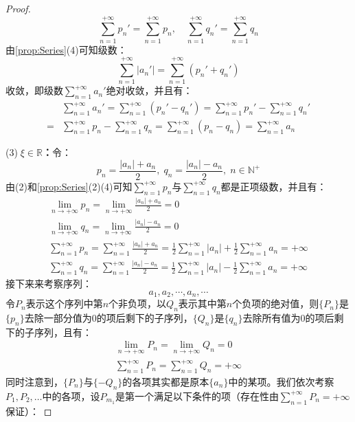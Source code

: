 \begin{proof}
	\begin{equation*}
		\sum_{n=1}^{+\infty}p_n'=\sum_{n=1}^{+\infty}p_n,\quad
		\sum_{n=1}^{+\infty}q_n'=\sum_{n=1}^{+\infty}q_n
	\end{equation*}
	由\cref{prop:Series}(4)可知级数：
	\begin{equation*}
		\sum_{n=1}^{+\infty}|a_n'|=\sum_{n=1}^{+\infty}(p_n'+q_n')
	\end{equation*}
	收敛，即级数$\sum\limits_{n=1}^{+\infty}a_n'$绝对收敛，并且有：
	\begin{align*}
		&\sum_{n=1}^{+\infty}a_n'=\sum_{n=1}^{+\infty}(p_n'-q_n')=\sum_{n=1}^{+\infty}p_n'-\sum_{n=1}^{+\infty}q_n' \\
		=&\sum_{n=1}^{+\infty}p_n-\sum_{n=1}^{+\infty}q_n=\sum_{n=1}^{+\infty}(p_n-q_n)=\sum_{n=1}^{+\infty}a_n
	\end{align*}\par
	(3)\textbf{$\;\xi\in\mathbb{R}$：}令：
	\begin{equation*}
		p_n=\frac{|a_n|+a_n}{2},\;q_n=\frac{|a_n|-a_n}{2},\;n\in\mathbb{N}^+
	\end{equation*}
	由(2)和\cref{prop:Series}(2)(4)可知$\sum\limits_{n=1}^{+\infty}p_n$与$\sum\limits_{n=1}^{+\infty}q_n$都是正项级数，并且有：
	\begin{gather*}
		\lim_{n\to+\infty}p_n=\lim_{n\to+\infty}\frac{|a_n|+a_n}{2}=0 \\
		\lim_{n\to+\infty}q_n=\lim_{n\to+\infty}\frac{|a_n|-a_n}{2}=0 \\
		\sum_{n=1}^{+\infty}p_n=\sum_{n=1}^{+\infty}\frac{|a_n|+a_n}{2}=\frac{1}{2}\sum_{n=1}^{+\infty}|a_n|+\frac{1}{2}\sum_{n=1}^{+\infty}a_n=+\infty \\
		\sum_{n=1}^{+\infty}q_n=\sum_{n=1}^{+\infty}\frac{|a_n|-a_n}{2}=\frac{1}{2}\sum_{n=1}^{+\infty}|a_n|-\frac{1}{2}\sum_{n=1}^{+\infty}a_n=+\infty
	\end{gather*}
	接下来来考察序列：
	\begin{equation*}
		a_1,a_2,\cdots,a_n,\cdots
	\end{equation*}
	令$P_n$表示这个序列中第$n$个非负项，以$Q_n$表示其中第$n$个负项的绝对值，则$\{P_n\}$是$\{p_n\}$去除一部分值为$0$的项后剩下的子序列，$\{Q_n\}$是$\{q_n\}$去除所有值为$0$的项后剩下的子序列，且有：
	\begin{gather*}
		\lim_{n\to+\infty}P_n=\lim_{n\to+\infty}Q_n=0 \\
		\sum_{n=1}^{+\infty}P_n=\sum_{n=1}^{+\infty}Q_n=+\infty
	\end{gather*}
	同时注意到，$\{P_n\}$与$\{-Q_n\}$的各项其实都是原本$\{a_n\}$中的某项。我们依次考察$P_1,P_2,\dots$中的各项，设$P_{m_1}$是第一个满足以下条件的项（存在性由$\sum\limits_{n=1}^{+\infty}P_n=+\infty$保证）：

\end{proof}
